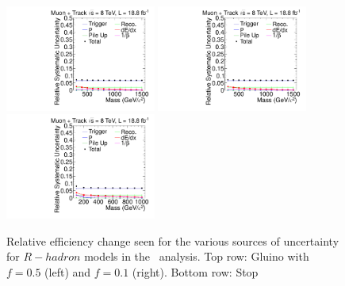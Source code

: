 \begin{figure}[ht]
\centering
  \includegraphics[clip=true, trim=0.0cm 0cm 2.8cm 0cm, width=0.44\textwidth]{figures/tkmu/MuGluino_f50Uncertainty}
  \includegraphics[clip=true, trim=0.0cm 0cm 2.8cm 0cm, width=0.44\textwidth]{figures/tkmu/MuGluino_f10Uncertainty}\\
  \includegraphics[clip=true, trim=0.0cm 0cm 2.8cm 0cm, width=0.44\textwidth]{figures/tkmu/MuStopUncertainty}
\caption[Relative efficiency change seen for the various sources of uncertainty for $R-hadron$ models in the \tktof\ analysis]
{Relative efficiency change seen for the various sources of uncertainty for $R-hadron$ models in the \tktof\ analysis.
Top row: Gluino with $f=0.5$ (left) and $f=0.1$ (right).
Bottom row: Stop}
    \label{fig:TkMuRHadUncSource}
\end{figure}

